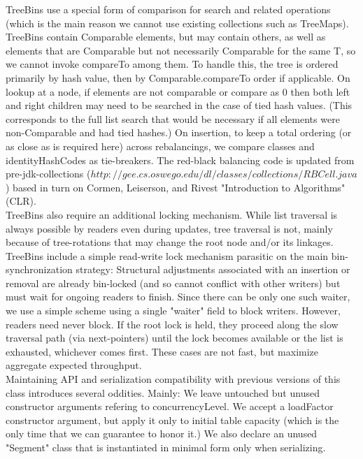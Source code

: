 \documentclass[UTF8,11pt]{ctexbook}
\begin{document}
	TreeBins use a special form of comparison for search and
	related operations (which is the main reason we cannot use
	existing collections such as TreeMaps). TreeBins contain
	Comparable elements, but may contain others, as well as
	elements that are Comparable but not necessarily Comparable for
	the same T, so we cannot invoke compareTo among them. To handle
	this, the tree is ordered primarily by hash value, then by
	Comparable.compareTo order if applicable.  On lookup at a node,
	if elements are not comparable or compare as 0 then both left
	and right children may need to be searched in the case of tied
	hash values. (This corresponds to the full list search that
	would be necessary if all elements were non-Comparable and had
	tied hashes.) On insertion, to keep a total ordering (or as
	close as is required here) across rebalancings, we compare
	classes and identityHashCodes as tie-breakers. The red-black
	balancing code is updated from pre-jdk-collections
	($http://gee.cs.oswego.edu/dl/classes/collections/RBCell.java$)
	based in turn on Cormen, Leiserson, and Rivest "Introduction to
	Algorithms" (CLR).\\
	
	TreeBins also require an additional locking mechanism.  While
	list traversal is always possible by readers even during
	updates, tree traversal is not, mainly because of tree-rotations
	that may change the root node and/or its linkages.  TreeBins
	include a simple read-write lock mechanism parasitic on the
	main bin-synchronization strategy: Structural adjustments
	associated with an insertion or removal are already bin-locked
	(and so cannot conflict with other writers) but must wait for
	ongoing readers to finish. Since there can be only one such
	waiter, we use a simple scheme using a single "waiter" field to
	block writers.  However, readers need never block.  If the root
	lock is held, they proceed along the slow traversal path (via
	next-pointers) until the lock becomes available or the list is
	exhausted, whichever comes first. These cases are not fast, but
	maximize aggregate expected throughput.\\
	
	Maintaining API and serialization compatibility with previous
	versions of this class introduces several oddities. Mainly: We
	leave untouched but unused constructor arguments refering to
	concurrencyLevel. We accept a loadFactor constructor argument,
	but apply it only to initial table capacity (which is the only
	time that we can guarantee to honor it.) We also declare an
	unused "Segment" class that is instantiated in minimal form
	only when serializing.\\
	
\end{document}
